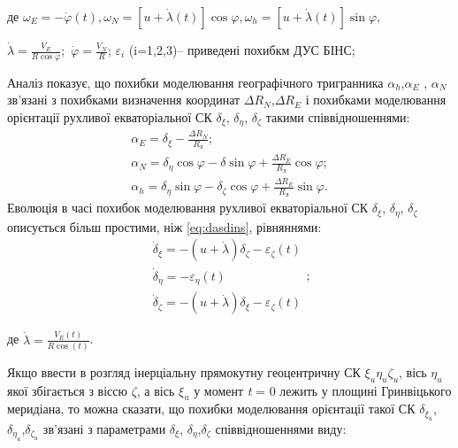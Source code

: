 \begin{ESKDexplanation}
\item де  $\omega_{E} =-\dot{\varphi }(t),\omega_{N} =\left[u+\dot{\lambda }(t)\right]
\cos \varphi ,\omega_{h} =\left[u+\dot{\lambda }(t)\right]\sin \varphi ,$
\item $\dot{\lambda }=\frac{V_{E} }{R\cos \varphi } ;$ $\dot{\varphi }=\frac{V_{N} }{R} $; $\varepsilon_{i}$
 (i=1,2,3)-- приведені похибкм ДУС БІНС;
\end{ESKDexplanation}
Аналіз показує, що похибки моделювання географічного тригранника $\alpha_{h} $,$\alpha_{E} $ ,
$\alpha_{N} $ зв'язані з похибками визначення координат $\Delta R_{N} $,$\Delta 
R_{E} $ і похибками моделювання орієнтації рухливої екваторіальної СК $\delta_{\xi} $, 
$\delta_{\eta } $, $\delta_{\zeta } $ такими   співвідношеннями:
\[\begin{array}{l} 
{\alpha_{E} =\delta_{\xi } -\frac{\Delta R_{N} }{R_{\text{З} } } ;} \\ 
{\alpha_{N} =\delta_{\eta } \cos \varphi -\delta \sin \varphi +\frac{\Delta R_{E} }{R_{\text{З} } } \cos \varphi ;} \\ 
{\alpha_{h} =\delta_{\eta } \sin \varphi-\delta_{\zeta } \cos \varphi +\frac{\Delta R_{E} }{R_{\text{З} } } \sin \varphi .} 
\end{array}\] 
Еволюція в часі похибок моделювання рухливої екваторіальної СК $\delta_{\xi } $, $\delta_{\eta } $,
$\delta_{\zeta } $ описується більш простими, ніж \eqref{eq:dasdins}, рівняннями:
\[\begin{array}{l} 
{\dot{\delta }_{\xi } =-(u+\dot{\lambda })\delta_{\zeta } -\varepsilon_{\zeta }(t)} \\ 
{\dot{\delta }_{\eta } =-\varepsilon_{\eta } (t)} \\ 
{\dot{\delta }_{\zeta } =-(u+\dot{\lambda })\delta_{\xi } -\varepsilon_{\zeta }(t)}\end{array};\] 
\begin{ESKDexplanation}
\item де $\dot{\lambda }=\frac{V_{E}(t)}{R\cos(t)} $.
\end{ESKDexplanation}
Якщо ввести в розгляд  інерціальну прямокутну геоцентричну СК $\xi_{u} \eta_{u} \zeta_{u} $, 
вісь $\eta_{u} $ якої збігається з віссю $\zeta $, 
а вісь $\xi_{u} $ у момент  \textit{t }= 0 лежить у площині Гринвіцького меридіана, 
то можна сказати, що похибки моделювання орієнтації такої СК $\delta_{\xi_{u}} $,
$\delta_{\eta_{u} } $,$\delta_{\zeta_{u} } $ зв'язані з параметрами $\delta_{\xi }$,
$\delta_{\eta } $,$\delta_{\zeta }$ співвідношеннями виду:
